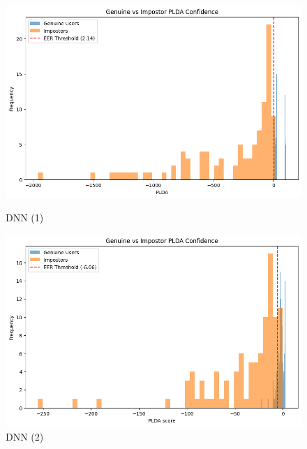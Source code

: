 \begin{figure}[ht]
    \centering
    \begin{minipage}{0.47\textwidth}
        \centering
        \includegraphics[width=\textwidth]{./ch4/dnn1.png}
        \caption{DNN (1)}
    \end{minipage}
    \begin{minipage}{0.47\textwidth}
        \centering
        \includegraphics[width=\textwidth]{./ch4/dnn2.png}
        \caption{DNN (2)}
    \end{minipage}


\end{figure}
